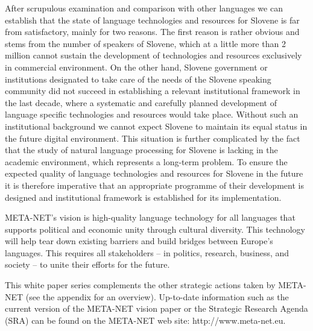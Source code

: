 \begin{multicols}{2}
After scrupulous examination and comparison with other languages we can establish that the state of language technologies and resources for Slovene is far from satisfactory, mainly for two reasons. The first reason is rather obvious and stems from the number of speakers of Slovene, which at a little more than 2 million cannot sustain the development of technologies and resources exclusively in commercial environment. On the other hand, Slovene government or institutions designated to take care of the needs of the Slovene speaking community did not succeed in establishing a relevant institutional framework in the last decade, where a systematic and carefully planned development of language specific technologies and resources would take place. Without such an institutional background we cannot expect Slovene to maintain its equal status in the future digital environment. This situation is further complicated by the fact that the study of natural language processing for Slovene is lacking in the academic environment, which represents a long-term problem. To ensure the expected quality of language technologies and resources for Slovene in the future it is therefore imperative that an appropriate programme of their development is designed and institutional framework is established for its implementation.


META-NET’s vision is high-quality language technology for all languages that supports political and economic unity through cultural diversity. This technology will help tear down existing barriers and build bridges between Europe’s languages. This requires all stakeholders -- in politics, research, business, and society -- to unite their efforts for the future.

This white paper series complements the other strategic actions taken by META-NET (see the appendix for an overview). Up-to-date information such as the current version of the META-NET vision paper \cite{Meta1} or the Strategic Research Agenda (SRA) can be found on the META-NET web site: http://www.meta-net.eu.
\end{multicols}

\clearpage


